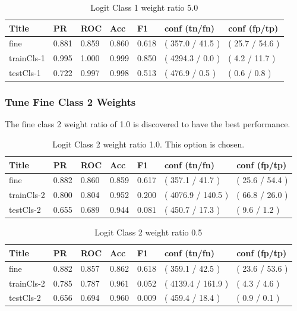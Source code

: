 \documentclass[ms]{nuthesis}
\begin{document}
\FloatBarrier
\begin{table}[H]
\centering
\caption{Logit Class 1 weight ratio 5.0}
\label{tab:LogRegCls1-Wt5}
\begin{tabular}{|l||l||l||l||l||l||l|}\toprule
Title & PR & ROC & Acc & F1 & conf (tn/fn) & conf (fp/tp) \\ \midrule
fine & 0.881 & 0.859 & 0.860 & 0.618 & ( 357.0 / 41.5 ) & ( 25.7 / 54.6 ) \\
trainCls-1 & 0.995 & 1.000 & 0.999 & 0.850 & ( 4294.3 / 0.0 ) & ( 4.2 / 11.7 ) \\
testCls-1 & 0.722 & 0.997 & 0.998 & 0.513 & ( 476.9 / 0.5 ) & ( 0.6 / 0.8 ) \\ \bottomrule
\end{tabular}
\end{table}
\FloatBarrier


\subsubsection{Tune Fine Class 2 Weights}
\par The fine class 2 weight ratio of 1.0 is discovered to have the best performance.
\FloatBarrier
\begin{table}[H]
\centering
\caption{Logit Class 2 weight ratio 1.0. This option is chosen.}
\label{tab:LogRegCls2-Wt1}
\begin{tabular}{|l||l||l||l||l||l||l|}\toprule
Title & PR & ROC & Acc & F1 & conf (tn/fn) & conf (fp/tp) \\ \midrule
fine & 0.882 & 0.860 & 0.859 & 0.617 & ( 357.1 / 41.7 ) & ( 25.6 / 54.4 ) \\
trainCls-2 & 0.800 & 0.804 & 0.952 & 0.200 & ( 4076.9 / 140.5 ) & ( 66.8 / 26.0 ) \\
testCls-2 & 0.655 & 0.689 & 0.944 & 0.081 & ( 450.7 / 17.3 ) & ( 9.6 / 1.2 ) \\ \bottomrule
\end{tabular}
\end{table}
\FloatBarrier

\FloatBarrier
\begin{table}[H]
\centering
\caption{Logit Class 2 weight ratio 0.5}
\label{tab:LogitCls2-Wtp5}
\begin{tabular}{|l||l||l||l||l||l||l|}\toprule
Title & PR & ROC & Acc & F1 & conf (tn/fn) & conf (fp/tp) \\ \midrule
fine & 0.882 & 0.857 & 0.862 & 0.618 & ( 359.1 / 42.5 ) & ( 23.6 / 53.6 ) \\
trainCls-2 & 0.785 & 0.787 & 0.961 & 0.052 & ( 4139.4 / 161.9 ) & ( 4.3 / 4.6 ) \\
testCls-2 & 0.656 & 0.694 & 0.960 & 0.009 & ( 459.4 / 18.4 ) & ( 0.9 / 0.1 ) \\ \bottomrule
\end{tabular}
\end{table}
\FloatBarrier
\end{document}
